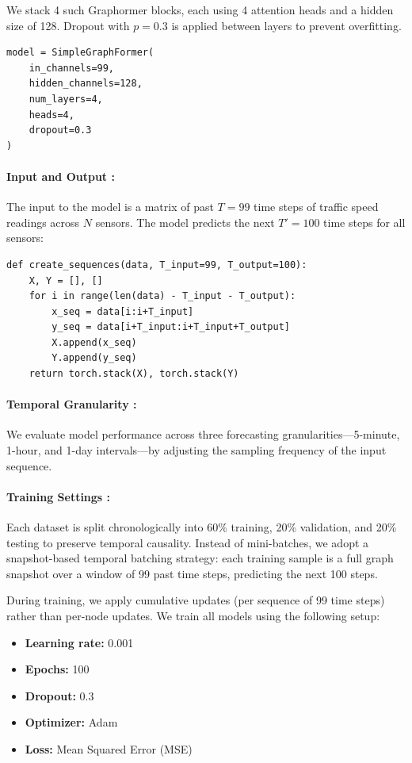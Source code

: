 \documentclass[runningheads]{llncs}
\begin{document}
We stack 4 such Graphormer blocks, each using 4 attention heads and a hidden size of 128. Dropout with $p=0.3$ is applied between layers to prevent overfitting.

\begin{lstlisting}[style=customPython]
model = SimpleGraphFormer(
    in_channels=99,
    hidden_channels=128,
    num_layers=4,
    heads=4,
    dropout=0.3
)
\end{lstlisting}

\paragraph{Input and Output : }
The input to the model is a matrix of past $T = 99$ time steps of traffic speed readings across $N$ sensors. The model predicts the next $T' = 100$ time steps for all sensors:

\begin{lstlisting}[style=customPython]
def create_sequences(data, T_input=99, T_output=100):
    X, Y = [], []
    for i in range(len(data) - T_input - T_output):
        x_seq = data[i:i+T_input]
        y_seq = data[i+T_input:i+T_input+T_output]
        X.append(x_seq)
        Y.append(y_seq)
    return torch.stack(X), torch.stack(Y)
\end{lstlisting}

\paragraph{Temporal Granularity : }
We evaluate model performance across three forecasting granularities—5-minute, 1-hour, and 1-day intervals—by adjusting the sampling frequency of the input sequence.

\paragraph{Training Settings : }
Each dataset is split chronologically into 60\% training, 20\% validation, and 20\% testing to preserve temporal causality. Instead of mini-batches, we adopt a snapshot-based temporal batching strategy: each training sample is a full graph snapshot over a window of 99 past time steps, predicting the next 100 steps.

During training, we apply cumulative updates (per sequence of 99 time steps) rather than per-node updates. We train all models using the following setup:

\begin{itemize}
    \item \textbf{Learning rate:} 0.001
    \item \textbf{Epochs:} 100
    \item \textbf{Dropout:} 0.3
    \item \textbf{Optimizer:} Adam
    \item \textbf{Loss:} Mean Squared Error (MSE)
\end{itemize}
\end{document}
